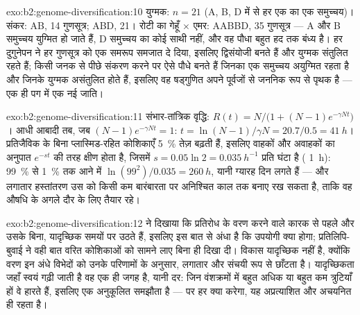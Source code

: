 \begin{solution}{exo:b2:genome-diversification:10}
युग्मक: $n = 21$ (A, B, D में से हर एक का एक समुच्चय)। संकर: AB, 14
गुणसूत्र; ABD, 21। रोटी का गेहूँ $\times$ एमर: AABBD, 35
गुणसूत्र --- A और B समुच्चय युग्मित हो जाते हैं, D समुच्चय का कोई साथी
नहीं, और वह पौधा बहुत हद तक बंध्य है। हर दुगुनेपन ने हर गुणसूत्र को एक
समरूप समजात दे दिया, इसलिए द्विसंयोजी बनते हैं और युग्मक संतुलित रहते
हैं; किसी जनक से पीछे संकरण करने पर ऐसे पौधे बनते हैं जिनका एक समुच्चय
अयुग्मित रहता है और जिनके युग्मक असंतुलित होते हैं, इसलिए वह षड्गुणित
अपने पूर्वजों से जननिक रूप से पृथक है --- एक ही पग में एक नई जाति।
\end{solution}

\begin{solution}{exo:b2:genome-diversification:11}
संभार-तांत्रिक वृद्धि: $R(t) = N/\bigl(1 + (N - 1)e^{-\gamma Nt}\bigr)$।
आधी आबादी तब, जब $(N - 1)e^{-\gamma Nt} = 1$: $t = \ln(N -
1)/\gamma N = 20.7/0.5 = \qty{41}{h}$। प्रतिजैविक के बिना
प्लास्मिड-रहित कोशिकाएँ \qty{5}{\%} तेज़ बढ़ती हैं, इसलिए वाहकों और
अवाहकों का अनुपात $e^{-st}$ की तरह क्षीण होता है, जिसमें $s = 0.05\ln 2 =
\qty{0.035}{h^{-1}}$ प्रति घंटा है ( \qty{1}{h}):
\qty{99}{\%} से \qty{1}{\%} तक आने में $\ln(99^2)/0.035 = \qty{260}{h}$,
यानी ग्यारह दिन लगते हैं --- और लगातार हस्तांतरण उस 
को किसी कम बारंबारता पर अनिश्चित काल तक बनाए रख सकता है, ताकि वह औषधि
के अगले दौर के लिए तैयार रहे।
\end{solution}

\begin{solution}{exo:b2:genome-diversification:12}
 ने दिखाया कि प्रतिरोध के  वरण करने वाले
कारक से पहले और उसके बिना, यादृच्छिक समयों पर उठते हैं, इसलिए
 इस बात से अंधा है कि उपयोगी क्या होगा; प्रतिलिपि-बुवाई ने
वही बात वरित कोशिकाओं को सामने लाए बिना ही दिखा दी। विकास यादृच्छिक नहीं
है, क्योंकि वरण इन अंधे विभेदों को उनके परिणामों के अनुसार, लगातार और
संचयी रूप से छाँटता है। यादृच्छिकता जहाँ स्वयं गढ़ी जाती है वह एक ही जगह
है, यानी दर: जिन वंशक्रमों में बहुत अधिक या बहुत कम त्रुटियाँ हों वे
हारते हैं, इसलिए  एक अनुकूलित समझौता है --- पर हर
 क्या करेगा, यह अप्रत्याशित और अचयनित ही रहता है।
\end{solution}

